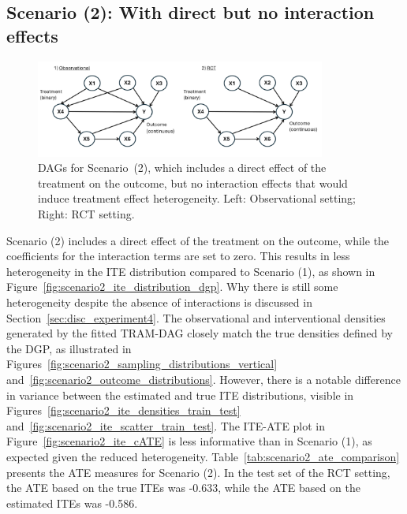 \clearpage


\subsection{Scenario (2): With direct but no interaction effects}

\begin{figure}[H]
\centering
\includegraphics[width=0.85\textwidth]{img/exp4_dag_2.png}
\caption{DAGs for Scenario~(2), which includes a direct effect of the treatment on the outcome, but no interaction effects that would induce treatment effect heterogeneity. Left: Observational setting; Right: RCT setting.}
\label{fig:ite_dag_observational_2}
\end{figure}

Scenario (2) includes a direct effect of the treatment on the outcome, while the coefficients for the interaction terms are set to zero. This results in less heterogeneity in the ITE distribution compared to Scenario (1), as shown in Figure~\ref{fig:scenario2_ite_distribution_dgp}. Why there is still some heterogeneity despite the absence of interactions is discussed in Section~\ref{sec:disc_experiment4}. The observational and interventional densities generated by the fitted TRAM-DAG closely match the true densities defined by the DGP, as illustrated in Figures~\ref{fig:scenario2_sampling_distributions_vertical} and~\ref{fig:scenario2_outcome_distributions}. However, there is a notable difference in variance between the estimated and true ITE distributions, visible in Figures~\ref{fig:scenario2_ite_densities_train_test} and~\ref{fig:scenario2_ite_scatter_train_test}. The ITE-ATE plot in Figure~\ref{fig:scenario2_ite_cATE} is less informative than in Scenario (1), as expected given the reduced heterogeneity. Table~\ref{tab:scenario2_ate_comparison} presents the ATE measures for Scenario (2). In the test set of the RCT setting, the ATE based on the true ITEs was -0.633, while the ATE based on the estimated ITEs was -0.586.


